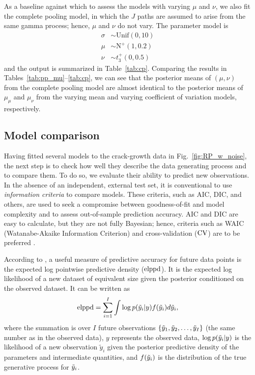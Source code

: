 \documentclass{article}
\begin{document}


As a baseline against which to assess the models with varying $\mu$ and $\nu$, we also fit the complete pooling model, in which the $J$ paths are assumed to arise from the same gamma process; hence, $\mu$ and $\nu$ do not vary. The parameter model is
\begin{align*}
    \sigma & \sim \mbox{Unif}(0, 10) \\
    \mu & \sim \mbox{N}^{+}(1, 0.2) \\
    \nu & \sim t^{+}_3(0, 0.5)
\end{align*}
and the output is summarized in Table~\ref{tab:cp}. Comparing the results in Tables~\ref{tab:pp_mu}--\ref{tab:cp}, we can see that the posterior means of $(\mu, \nu)$ from the complete pooling model are almost identical to the posterior means of $\mu_\mu$ and $\mu_\nu$ from the varying mean and varying coefficient of variation models, respectively.



\subsection{Model comparison}
\label{subsec:modcomp}

Having fitted several models to the crack-growth data in Fig.~\ref{fig:RP_w_noise}, the next step is to check how well they describe the data generating process and to compare them. To do so, we evaluate their ability to predict new observations. In the absence of an independent, external test set, it is conventional to use \textit{information criteria} to compare models. These criteria, such as AIC, DIC, and others, are used to seek a compromise between goodness-of-fit and model complexity and to assess out-of-sample prediction accuracy. AIC and DIC are easy to calculate, but they are not fully Bayesian; hence, criteria such as WAIC (Watanabe-Akaike Information Criterion) and cross-validation ($\hbox{CV}$) are to be preferred \citep{Vehtari2017}.

According to \citet{Vehtari2017}, a useful measure of predictive accuracy for future data points is the expected log pointwise predictive density ($\hbox{elppd}$). It is the expected log likelihood of a new dataset of equivalent size given the posterior conditioned on the observed dataset. It can be written as 
\begin{equation} \label{eq:elppd}
    \hbox{elppd} = \sum^I_{i = 1} \int \log p(\Tilde{y}_i|y) f(\Tilde{y}_i) d\Tilde{y}_i,
\end{equation}
where the summation is over $I$ future observations $\{\Tilde{y}_1, \Tilde{y}_2, \ldots, \Tilde{y}_I\}$ (the same number as in the observed data), $y$ represents the observed data, $\log p(\Tilde{y}_i|y)$ is the likelihood of a new observation $\tilde{y}_i$ given the posterior predictive density of the parameters and intermediate quantities, and $f(\Tilde{y}_i)$ is the distribution of the true generative process for $\Tilde{y}_i$.
\end{document}
